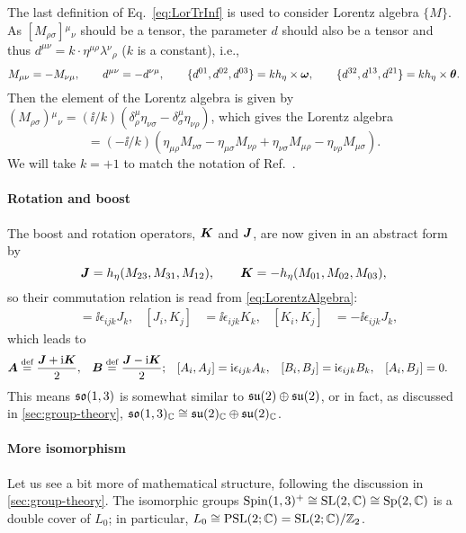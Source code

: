 \documentclass[CheatSheet]{subfiles}
\newcommand\defeq{\mathrel{\stackrel{\text{def}}=}}
\begin{document}
The last definition of Eq.~\eqref{eq:LorTrInf} is used to consider Lorentz algebra $\{M\}$.
As $[M_{\rho\sigma}]{}^\mu{}_\nu$ should be a tensor, the parameter $d$ should also be a tensor and thus $d^{\mu\nu}=k\cdot\eta^{\mu\rho}\lambda{}^\nu{}_\rho$ ($k$ is a constant), i.e.,
\begin{equation}
 M_{\mu\nu}=-M_{\nu\mu}, \qquad
 d^{\mu\nu}=-d^{\nu\mu}, \qquad
 \{d^{01},d^{02},d^{03}\}=kh_\eta\times{\boldsymbol{\omega}},\qquad
 \{d^{32},d^{13},d^{21}\}=kh_\eta\times{\boldsymbol{\theta}}.
\end{equation}
Then the element of the Lorentz algebra is given by
$ (M_{\rho\sigma}){}^\mu{}_\nu=
(\ii/k)(\delta^\mu_\rho\eta_{\nu\sigma}-\delta^\mu_\sigma \eta_{\nu\rho})
$, which gives the Lorentz algebra
\begin{equation}
[M_{\mu\nu},M_{\rho\sigma}] = 
(-\ii/k)\left(\eta_{\mu\rho}M_{\nu\sigma}-\eta_{\mu\sigma}M_{\nu\rho}
+\eta_{\nu\sigma}M_{\mu\rho}-\eta_{\nu\rho}M_{\mu\sigma}
\right).
\label{eq:LorentzAlgebra}
\end{equation}
We will take $k=+1$ to match the notation of Ref.~\cite{Kugo1}.

\paragraph{Rotation and boost}
The boost and rotation operators, ${\boldsymbol{K}}$ and ${\boldsymbol{J}}$, are now given in an abstract form by
\begin{equation}
 {\boldsymbol{J}} = h_\eta (M_{23}, M_{31}, M_{12}), \qquad
 {\boldsymbol{K}} = -h_\eta(M_{01}, M_{02}, M_{03}),
\end{equation}
so their commutation relation is read from \cref{eq:LorentzAlgebra}:
\begin{align}
 [J_i, J_j] &= \ii \epsilon_{ijk}J_k,&
 [J_i, K_j] &= \ii \epsilon_{ijk}K_k,&
 [K_i, K_j] &= -\ii \epsilon_{ijk}J_k,
\end{align}
which leads to
\begin{align}
 \vc A&\defeq\frac{\vc J+\ii \vc K}{2},&
 \vc B&\defeq\frac{\vc J-\ii \vc K}{2};&
 [A_i, A_j] &= \ii \epsilon_{ijk}A_k,&
 [B_i, B_j] &= \ii \epsilon_{ijk}B_k,&
 [A_i, B_j] &= 0.
\end{align}
This means $\operatorname{\mathfrak{so}}(1,3)$ is somewhat similar to $\operatorname{\mathfrak{su}}(2)\oplus \operatorname{\mathfrak{su}}(2)$, or in fact,
as discussed in \cref{sec:group-theory},
$\operatorname{\mathfrak{so}}(1,3)_{\mathbb C}\cong \operatorname{\mathfrak{su}}(2)_{\mathbb C}\oplus\operatorname{\mathfrak{su}}(2)_{\mathbb C}$.

\paragraph{More isomorphism}
Let us see a bit more of  mathematical structure, following the discussion in \cref{sec:group-theory}.
The isomorphic groups
$\mathop{\mathrm{Spin}}(1,3)^+\cong\operatorname{\mathrm SL}(2,\mathbb C)\cong\operatorname{\mathrm Sp}(2,\mathbb C)$
is a double cover of $L_0$;
in particular, $L_0\cong \mathop{\mathrm{PSL}}(2;\mathbb C)=\operatorname{\mathrm SL}(2;\mathbb C)/\mathbb Z_2$.
\end{document}
